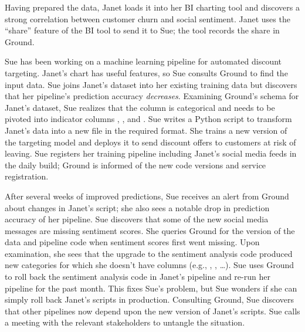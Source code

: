 \documentclass{sig-alternate}
\begin{document}
Having prepared the data, Janet loads it into her BI charting tool and discovers a strong correlation between customer churn and social sentiment. 
Janet uses the ``share'' feature of the BI tool to send it to Sue; the tool records the share in Ground.


Sue has been working on a machine learning pipeline for automated discount targeting. Janet's chart has useful features, so Sue consults Ground to find the input data.
Sue joins Janet's dataset into her existing training data but discovers that her pipeline's prediction accuracy \emph{decreases}.  
Examining Ground's schema for Janet's dataset, Sue realizes that the  column is categorical and needs to be pivoted into indicator columns , , and . 
Sue writes a Python script to transform Janet's data into a new file in the required format.
She trains a new version of the targeting model and deploys it to send discount offers to customers at risk of leaving.
Sue registers her training pipeline including Janet's social media feeds in the daily build; Ground is informed of the new code versions and service registration.

After several weeks of improved predictions, Sue receives an alert from Ground about changes in Janet's script; she also sees a notable drop in prediction accuracy of her pipeline. 
Sue discovers that some of the new social media messages are missing sentiment scores.
She queries Ground for the version of the data and pipeline code when sentiment scores first went missing.
Upon examination, she sees that the upgrade to the sentiment analysis code produced new categories for which she doesn't have columns (e.g., , , \ldots).
Sue uses Ground to roll back the sentiment analysis code in Janet's pipeline and re-run her pipeline for the past month.  
This fixes Sue's problem, but Sue wonders if she can simply roll back Janet's scripts in production. 
Consulting Ground, Sue discovers that other pipelines now depend upon the new version of Janet's scripts.
Sue calls a meeting with the relevant stakeholders to untangle the situation.


\end{document}
